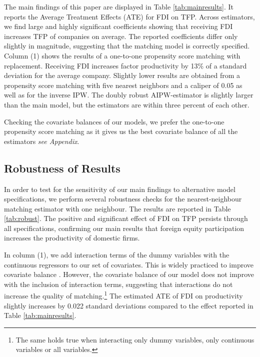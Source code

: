\documentclass[a4paper,11pt]{scrartcl}
\begin{document}
The main findings of this paper are displayed in Table \ref{tab:mainresults}. It reports the Average Treatment Effects (ATE) for FDI on TFP. Across estimators, we find large and highly significant coefficients showing that receiving FDI increases TFP of companies on average. The reported coefficients differ only slightly in magnitude, suggesting that the matching model is correctly specified. 
Column (1) shows the results of a one-to-one propensity score matching with replacement. Receiving FDI  increases factor productivity by 13\% of a standard deviation for the average company. Slightly lower results are obtained from a propensity score matching with five nearest neighbors and a caliper of 0.05 as well as for the inverse IPW. The doubly robust AIPW-estimator is slightly larger than the main model, but the estimators are within three percent of each other.

Checking the covariate balances of our models, we prefer the one-to-one propensity score matching as it gives us the best covariate balance of all the estimators \textit{see Appendix}. %


\subsection{Robustness of Results}

In order to test for the sensitivity of our main findings to alternative model specifications, we perform several robustness checks for the nearest-neighbour matching estimator with one neighbour. The results are reported in Table \ref{tab:robust}. The positive and significant effect of FDI on TFP persists through all specifications, confirming our main results that foreign equity participation increases the productivity of domestic firms. 

In column (1), we add interaction terms of the dummy variables with the continuous regressors to our set of covariates. This is widely practiced to improve covariate balance \citep{Caliendo08}.
However, the covariate balance of our model does not improve with the inclusion of interaction terms, suggesting that interactions do not increase the quality of matching.\footnote{The same holds true when interacting only dummy variables, only continuous variables or all variables.} The estimated ATE of FDI on productivity slightly increases by 0.022 standard deviations compared to the effect reported in Table \ref{tab:mainresults}. 
\end{document}
